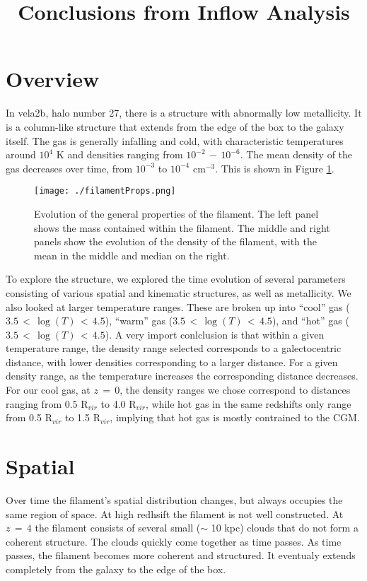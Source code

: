 \documentclass{article}
\title{Conclusions from Inflow Analysis}
\begin{document}
\maketitle



\section{Overview}

In vela2b, halo number 27, there is a structure with abnormally low
metallicity.  It is a column-like structure that extends from the edge of the 
box to the galaxy itself. The gas is generally infalling and cold, with  
characteristic temperatures around $10^4$ K and densities ranging from 
$10^{-2}\,-\,10^{-6}$. The mean density of the gas decreases over time, from
$10^{-3}$ to $10^{-4}$ cm$^{-3}$. This is shown in Figure \ref{generalTrend}.

\begin{figure}[h]
\centering
\texttt{[image: ./filamentProps.png]}
\caption{Evolution of the general properties of the filament. The left panel
shows the mass contained within the filament. The middle and right panels show
the evolution of the density of the filament, with the mean in the middle and
median on the right.}
\label{generalTrend}
\end{figure}


To explore the structure, we explored the time evolution of several parameters
consisting of various spatial and kinematic structures, as well as metallicity.
We also looked at larger temperature ranges. These are broken up into ``cool''
gas ($3.5\,<\,\log(T)\,<\,4.5$), ``warm'' gas ($3.5\,<\,\log(T)\,<\,4.5$), and
``hot'' gas ($3.5\,<\,\log(T)\,<\,4.5$). A very import conlclusion is that
within a given temperature range, the density range selected corresponds to a
galectocentric distance, with lower densities corresponding to a larger
distance. For a given density range, as the temperature increases the
corresponding distance decreases. For our cool gas, at $z\,=\,0$, the density
ranges we chose correspond to distances ranging from 0.5 R$_{vir}$ to 4.0
R$_{vir}$, while hot gas in the same redshifts only range from 0.5 R$_{vir}$
to 1.5 R$_{vir}$, implying that hot gas is mostly contrained to the CGM. 



\section{Spatial}
Over time the filament's spatial distribution changes, but always occupies the same 
region of space. At high redhsift the filament is not well constructed. At $z\,=\,4$
the filament consists of several small ($\sim$ 10 kpc) clouds that do not form a
coherent structure. The clouds quickly come together as time passes. As time
passes, the filament becomes more coherent and structured. It eventualy extends
completely from the galaxy to the edge of the box. 
\end{document}

